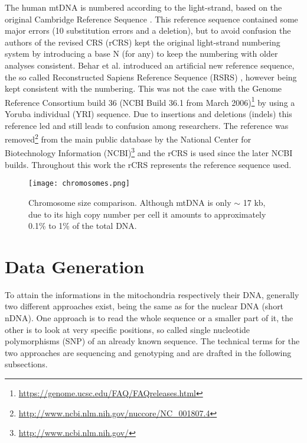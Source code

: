 The human mtDNA is numbered according to the light-strand, based on the original Cambridge Reference Sequence \cite{Anderson1981}. This reference sequence contained some major errors (10 substitution errors and a deletion), but to avoid confusion the authors of the revised CRS (rCRS) \cite{Andrews1999} kept the original light-strand numbering system by introducing a base N (for any) to keep the numbering with older analyses consistent. Behar et al. \cite{Behar2012} introduced an artificial new reference sequence, the so called Reconstructed Sapiens Reference Sequence (RSRS) \cite{Bandelt2013}, however being kept consistent with the numbering. This was not the case with the Genome Reference Consortium build 36 (NCBI Build 36.1 from March 2006)\footnote{\url{https://genome.ucsc.edu/FAQ/FAQreleases.html}} by using a Yoruba individual (YRI) sequence. Due to insertions and deletions (indels) this reference led and still leads to confusion among researchers. The reference was removed\footnote{\url{http://www.ncbi.nlm.nih.gov/nuccore/NC_001807.4}} from the main public database by the National Center for Biotechnology Information (NCBI)\footnote{\url{http://www.ncbi.nlm.nih.gov/}} and the rCRS is used since the later NCBI builds. Throughout this work the rCRS represents the reference sequence used. 


\begin{figure}[ht]
\begin{center}
\texttt{[image: chromosomes.png]}
\caption[Chromosome size comparison]{Chromosome size comparison. Although mtDNA is only $\sim$ 17 kb, due to its high copy number per cell it amounts to approximately 0.1\% to 1\% of the total DNA.}
\label{fig:figureChromosomes}
\end{center}

\end{figure}

\section{Data Generation}
\label{sec:dataGeneration}
To attain the informations in the mitochondria respectively their DNA, generally two different approaches exist, being the same as for the nuclear DNA (short nDNA). One approach is to read the whole sequence or a smaller part of it, the other is to look at very specific positions, so called single nucleotide polymorphisms (SNP) of an already known sequence. The technical terms for the two approaches are sequencing and genotyping and are drafted in the following subsections.
